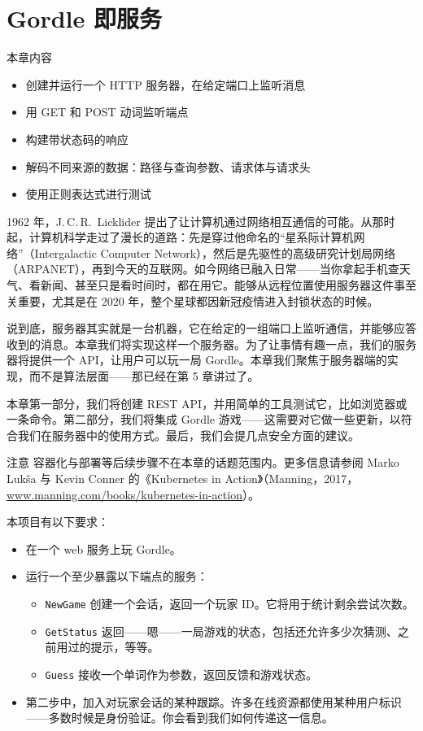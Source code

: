 \chapter{Gordle 即服务}

\begin{infobox}{本章内容}
\begin{itemize}
  \item 创建并运行一个 HTTP 服务器，在给定端口上监听消息
  \item 用 GET 和 POST 动词监听端点
  \item 构建带状态码的响应
  \item 解码不同来源的数据：路径与查询参数、请求体与请求头
  \item 使用正则表达式进行测试
\end{itemize}
\end{infobox}

1962 年，J.\,C.\,R.~Licklider 提出了让计算机通过网络相互通信的可能。从那时起，计算机科学走过了漫长的道路：先是穿过他命名的``星系际计算机网络''（Intergalactic Computer Network），然后是先驱性的高级研究计划局网络（ARPANET），再到今天的互联网。如今网络已融入日常——当你拿起手机查天气、看新闻、甚至只是看时间时，都在用它。能够从远程位置使用服务器这件事至关重要，尤其是在 2020 年，整个星球都因新冠疫情进入封锁状态的时候。

说到底，服务器其实就是一台机器，它在给定的一组端口上监听通信，并能够应答收到的消息。本章我们将实现这样一个服务器。为了让事情有趣一点，我们的服务器将提供一个 API，让用户可以玩一局 Gordle。本章我们聚焦于服务器端的实现，而不是算法层面——那已经在第 5 章讲过了。

本章第一部分，我们将创建 REST API，并用简单的工具测试它，比如浏览器或一条命令。第二部分，我们将集成 Gordle 游戏——这需要对它做一些更新，以符合我们在服务器中的使用方式。最后，我们会提几点安全方面的建议。

\begin{infobox}{注意}
容器化与部署等后续步骤不在本章的话题范围内。更多信息请参阅 Marko Lukša 与 Kevin Conner 的《Kubernetes in Action》（Manning，2017，\url{www.manning.com/books/kubernetes-in-action}）。
\end{infobox}

本项目有以下要求：

\begin{itemize}
  \item 在一个 web 服务上玩 Gordle。
  \item 运行一个至少暴露以下端点的服务：
  \begin{itemize}
    \item \texttt{NewGame} 创建一个会话，返回一个玩家 ID。它将用于统计剩余尝试次数。
    \item \texttt{GetStatus} 返回——嗯——一局游戏的状态，包括还允许多少次猜测、之前用过的提示，等等。
    \item \texttt{Guess} 接收一个单词作为参数，返回反馈和游戏状态。
  \end{itemize}
  \item 第二步中，加入对玩家会话的某种跟踪。许多在线资源都使用某种用户标识——多数时候是身份验证。你会看到我们如何传递这一信息。
\end{itemize}

